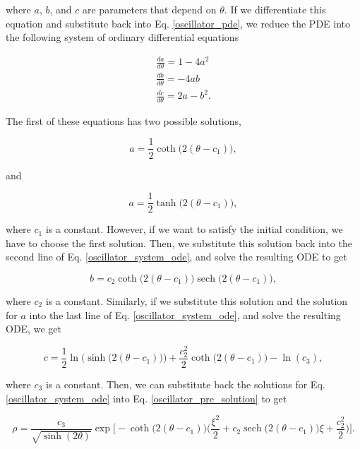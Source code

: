 \documentclass{article}
\DeclareMathOperator{\sech}{sech}
\begin{document}
where $a$, $b$, and $c$ are parameters that depend on $\theta$. If we differentiate this equation and substitute back into Eq. \ref{oscillator_pde}, we reduce the PDE into the following system of ordinary differential equations

\begin{equation}\label{oscillator_system_ode}
    \begin{split}
        \frac{d a}{d\theta} = 1 - 4a^{2} \\ \frac{d b}{d\theta}=-4ab \\ \frac{dc}{d\theta}=2a-b^{2}.
    \end{split}
\end{equation}

The first of these equations has two possible solutions,

\begin{equation}
    a = \frac{1}{2} \coth\big(2(\theta - c_{1})\big),
\end{equation}

and 

\begin{equation}
    a = \frac{1}{2} \tanh\big(2(\theta - c_{1})\big),
\end{equation}

where $c_{1}$ is a constant.
However, if we want to satisfy the initial condition, we have to choose the first solution. Then, we substitute this solution back into the second line of Eq. \ref{oscillator_system_ode}, and solve the resulting ODE to get

\begin{equation}
    b = c_{2} \coth \big( 2(\theta - c_{1}) \big) \sech \big( 2(\theta - c_{1}) \big),
\end{equation}

where $c_{2}$ is a constant. Similarly, if we substitute this solution and the solution for $a$ into the last line of Eq. \ref{oscillator_system_ode}, and solve the resulting ODE, we get

\begin{equation}
    c = \frac{1}{2} \ln \Big(\sinh \big( 2(\theta - c_{1}) \big) \Big) + \frac{c_{2}^{2}}{2} \coth \big( 2(\theta - c_{1}) \big) - \ln (c_{3}),
\end{equation}

where $c_{3}$ is a constant. Then, we can substitute back the solutions for Eq. \ref{oscillator_system_ode} into Eq. \ref{oscillator_pre_solution} to get

\begin{equation}
    \rho = \frac{c_{3}}{\sqrt{\sinh(2\theta)}} \exp \bigg[ -\coth \big(2(\theta - c_{1})) \bigg( \frac{\xi^{2}}{2} + c_{2} \sech \big( 2(\theta - c_{1}) \big)\xi + \frac{c_{2}^{2}}{2} \bigg) \bigg]. 
\end{equation}
\end{document}
